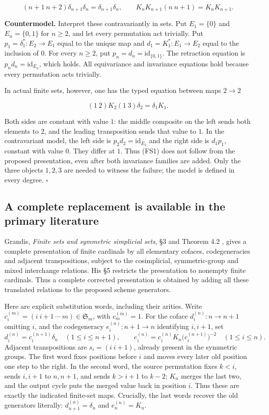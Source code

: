 \documentclass[11pt,a4paper]{article}
\theoremstyle{definition}
\begin{document}
\[(n+1\ n+2)\delta_{n+1}\delta_n=\delta_{n+1}\delta_n,
\qquad K_nK_{n+1}(n\ n+1)=K_nK_{n+1}.\]

\textbf{Countermodel.} Interpret these contravariantly in sets. Put
\(E_1=\{0\}\) and \(E_n=\{0,1\}\) for \(n\ge2\), and let every
permutation act trivially. Put \(p_1=\delta_1^*:E_2\to E_1\) equal to
the unique map and \(d_1=K_1^*:E_1\to E_2\) equal to the inclusion of
\(0\). For every \(n\ge2\), put \(p_n=d_n=\mathrm{id}_{\{0,1\}}\). The
retraction equation is \(p_nd_n=\mathrm{id}_{E_n}\), which holds. All
equivariance and invariance equations hold because every permutation
acts trivially.

In actual finite sets, however, one has the typed equation between maps
\(2\to2\)

\[\boxed{(1\ 2)K_2(1\ 3)\delta_2=\delta_1K_1.}\tag{FS1}\]

Both sides are constant with value \(1\): the middle composite on the
left sends both elements to \(2\), and the leading transposition sends
that value to \(1\). In the contravariant model, the left side is
\(p_2d_2=\mathrm{id}_{E_2}\) and the right side is \(d_1p_1\), constant
with value \(0\). They differ at \(1\). Thus (FS1) does not follow
from the proposed presentation, even after both invariance families are
added. Only the three objects \(1,2,3\) are needed to witness the
failure; the model is defined in every degree. \(\square\)

\subsection{A complete replacement is available in the primary
literature}\label{b6.2.-a-complete-replacement-is-available-in-the-primary-literature}

Grandis, \emph{Finite sets and symmetric simplicial sets},
§3 and Theorem 4.2 \cite{Grandis}, gives a complete presentation
of finite cardinals by all elementary cofaces, codegeneracies and
adjacent transpositions, subject to the cosimplicial, symmetric-group
and mixed interchange relations. His §5 restricts the presentation to
nonempty finite cardinals. Thus a complete corrected presentation is
obtained by adding all these translated relations to the proposed scheme
generators.

Here are explicit substitution words, including their arities.  Write
\(c_i^{(m)}=(i\ i+1\ \cdots\ m)\in\mathfrak S_m\), with
\(c_m^{(m)}=1\).  For the coface \(d_i^{(n)}:n\to n+1\) omitting
\(i\), and the codegeneracy \(e_i^{(n)}:n+1\to n\) identifying
\(i,i+1\), set
\[
 d_i^{(n)}=c_i^{(n+1)}\delta_n\quad(1\le i\le n+1),\qquad
 e_i^{(n)}=c_i^{(n)}K_n\bigl(c_i^{(n+1)}\bigr)^{-2}
       \quad(1\le i\le n).
 \tag{FS2}
\]
Adjacent transpositions are \(s_i=(i\ i+1)\), already present in the
symmetric groups.  The first word fixes positions before \(i\) and
moves every later old position one step to the right.  In the second
word, the source permutation fixes \(k<i\), sends \(i,i+1\) to
\(n,n+1\), and sends \(k>i+1\) to \(k-2\); \(K_n\) merges the last
two, and the output cycle puts the merged value back in position
\(i\).  Thus these are exactly the indicated finite-set maps.
Crucially, the last words recover the old generators literally:
\(d_{n+1}^{(n)}=\delta_n\) and \(e_n^{(n)}=K_n\).
\end{document}
